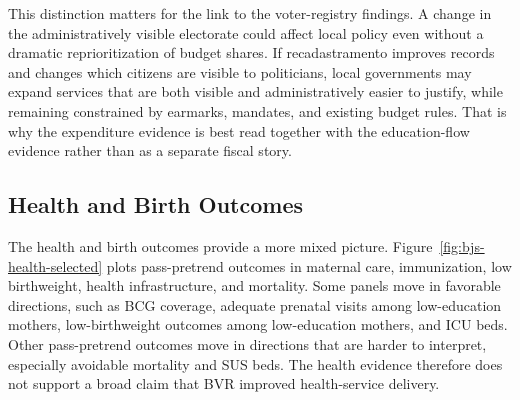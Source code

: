 This distinction matters for the link to the voter-registry findings. A change in the administratively visible electorate could affect local policy even without a dramatic reprioritization of budget shares. If recadastramento improves records and changes which citizens are visible to politicians, local governments may expand services that are both visible and administratively easier to justify, while remaining constrained by earmarks, mandates, and existing budget rules. That is why the expenditure evidence is best read together with the education-flow evidence rather than as a separate fiscal story.

\subsection{Health and Birth Outcomes}
\label{ssec:policy-health}

The health and birth outcomes provide a more mixed picture. Figure~\hyperref[fig:bjs-health-selected]{\ref*{fig:bjs-health-selected}} plots pass-pretrend outcomes in maternal care, immunization, low birthweight, health infrastructure, and mortality. Some panels move in favorable directions, such as BCG coverage, adequate prenatal visits among low-education mothers, low-birthweight outcomes among low-education mothers, and ICU beds. Other pass-pretrend outcomes move in directions that are harder to interpret, especially avoidable mortality and SUS beds. The health evidence therefore does not support a broad claim that BVR improved health-service delivery.

